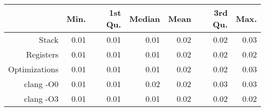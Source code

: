 \begin{table}[ht]
\centering
\begin{tabular}{rrrrrrr}
  \hline
 & Min. & 1st Qu. & Median & Mean & 3rd Qu. & Max. \\ 
  \hline
Stack & 0.01 & 0.01 & 0.01 & 0.02 & 0.02 & 0.03 \\ 
  Registers & 0.01 & 0.01 & 0.01 & 0.02 & 0.02 & 0.02 \\ 
  Optimizations & 0.01 & 0.01 & 0.01 & 0.02 & 0.02 & 0.03 \\ 
  clang -O0 & 0.01 & 0.01 & 0.02 & 0.02 & 0.03 & 0.03 \\ 
  clang -O3 & 0.01 & 0.01 & 0.01 & 0.02 & 0.02 & 0.02 \\ 
   \hline
\end{tabular}
\end{table}
